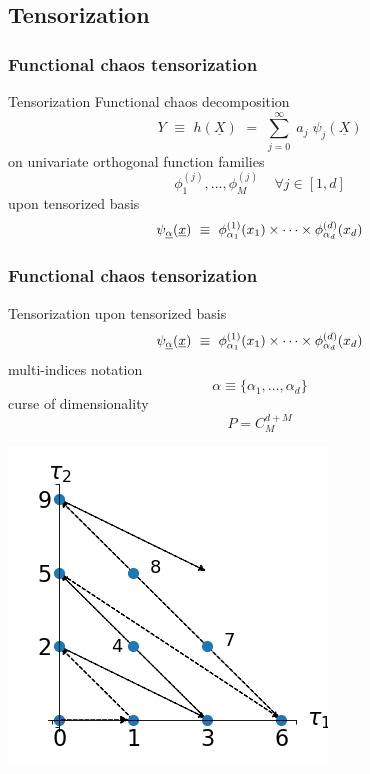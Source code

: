 \documentclass{beamer}
\begin{document}
\subsection[Tensorization]{Tensorization}
\begin{frame}
  \frametitle{Functional chaos tensorization}
  \begin{block}{Tensorization}
    Functional chaos decomposition
    $$
    Y \, \,  \equiv \, \,  h(\underline{X}) \, \, = \, \, \sum_{j=0}^{\infty} \; a_{j} \; \psi_{j}(\underline{X})
    $$
    on univariate orthogonal function families
    $$
    \phi^{(j)}_1, ..., \phi^{(j)}_M ~~~~~ \forall j \in [1, d]
    $$
    upon tensorized basis
    $$
    \psi_{{\underline{\alpha}}}({\underline{x}}) \, \, \equiv \,\, \phi^{(1)}_{\alpha_{1}}(x_{1}) \times \cdots \times \phi^{(d)}_{\alpha_{d}}(x_{d})
    $$
  \end{block}
\end{frame}



\begin{frame}
  \frametitle{Functional chaos tensorization}
  \begin{block}{Tensorization}
    upon tensorized basis
    $$
    \psi_{{\underline{\alpha}}}({\underline{x}}) \, \, \equiv \,\, \phi^{(1)}_{\alpha_{1}}(x_{1}) \times \cdots \times \phi^{(d)}_{\alpha_{d}}(x_{d})
    $$
    multi-indices notation
    $$
    \alpha \equiv \{\alpha_{1},\dots,\alpha_{d}\}
    $$
    curse of dimensionality
    $$
    P = C^{d+M}_{M}
    $$
  \end{block}
  \includegraphics[scale=0.3]{figures/enumerate.png}
\end{frame}
\end{document}
